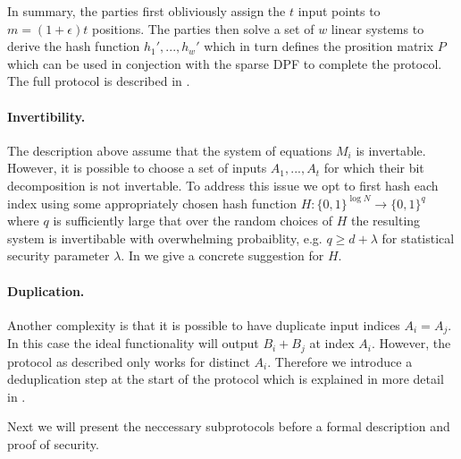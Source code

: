 In summary, the parties first obliviously assign the $t$ input points to $m=(1+\epsilon)t$ positions. The parties then solve a set of $w$ linear systems to derive the hash function $h_1',...,h_{w}'$ which in turn defines the prosition matrix $P$ which can be used in conjection with the sparse DPF to complete the protocol. The full protocol is described in .

\paragraph{Invertibility.} The description above assume that the system of equations $M_i$ is invertable. However, it is possible to choose a set of inputs $A_1,...,A_t$ for which their bit decomposition is not invertable. To address this issue we opt to first hash each index using some appropriately chosen hash function $H :\{0,1\}^{\log N}\rightarrow\{0,1\}^q$ where $q$ is sufficiently large that over the random choices of $H$ the resulting system is invertibable with overwhelming probaiblity, e.g. $q\geq d+\lambda$ for statistical security parameter $\lambda$. In  we give a concrete suggestion for $H$.

\paragraph{Duplication.} Another complexity is that it is possible to have duplicate input indices $A_i=A_j$. In this case the ideal functionality will output $B_i+B_j$ at index $A_i$. However, the protocol as described only works for distinct $A_i$. Therefore we introduce a deduplication step at the start of the protocol which is explained in more detail in .

Next we will present the neccessary subprotocols before a formal description and proof of security.




